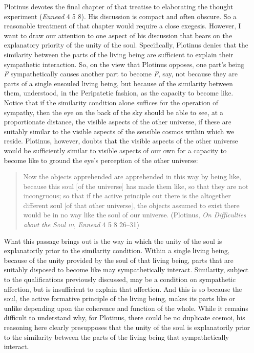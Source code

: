 Plotinus devotes the final chapter of that treatise to elaborating the thought experiment (\emph{Ennead} 4 5 8). His discussion is compact and often obscure. So a reasonable treatment of that chapter would require a close exegesis. However, I want to draw our attention to one aspect of his discussion that bears on the explanatory priority of the unity of the soul. Specifically, Plotinus denies that the similarity between the parts of the living being are sufficient to explain their sympathetic interaction. So, on the view that Plotinus opposes, one part's being \emph{F} sympathetically causes another part to become \emph{F}, say, not because they are parts of a single ensouled living being, but because of the similarity between them, understood, in the Peripatetic fashion, as the capacity to become like. Notice that if the similarity condition alone suffices for the operation of sympathy, then the eye on the back of the sky should be able to see, at a proportionate distance, the visible aspects of the other universe, if these are suitably similar to the visible aspects of the sensible cosmos within which we reside. Plotinus, however, doubts that the visible aspects of the other universe would be sufficiently similar to visible aspects of our own for a capacity to become like to ground the eye's perception of the other universe:
\begin{quote}
	Now the objects apprehended are apprehended in this way by being like, because this soul [of the universe] has made them like, so that they are not incongruous; so that if the active principle out there is the altogether different soul [of that other universe], the objects assumed to exist there would be in no way like the soul of our universe. (Plotinus, \emph{On Difficulties about the Soul \textsc{iii}}, \emph{Ennead} 4 5 8 26--31)
\end{quote}
What this passage brings out is the way in which the unity of the soul is explanatorily prior to the similarity condition. Within a single living being, because of the unity provided by the soul of that living being, parts that are suitably disposed to become like may sympathetically interact. Similarity, subject to the qualifications previously discussed, may be a condition on sympathetic affection, but is insufficient to explain that affection. And this is so because the soul, the active formative principle of the living being, makes its parts like or unlike depending upon the coherence and function of the whole. While it remains difficult to understand why, for Plotinus, there could be no duplicate cosmoi, his reasoning here clearly presupposes that the unity of the soul is explanatorily prior to the similarity between the parts of the living being that sympathetically interact.

